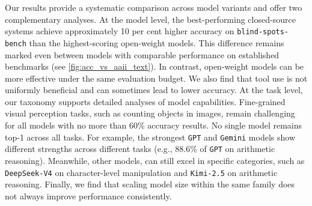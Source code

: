 \documentclass{article}
\newcommand{\bench}{\texttt{blind-spots-bench}\xspace}    %
\begin{document}


Our results provide a systematic comparison across model variants and offer two complementary analyses. At the model level, the best-performing closed-source systems achieve approximately 10 per cent higher accuracy on \bench than the highest-scoring open-weight models. This difference remains marked even between models with comparable performance on established benchmarks (see \autoref{fig:acc_vs_aaii_text}). In contrast, open-weight models can be more effective under the same evaluation budget. We also find that tool use is not uniformly beneficial and can sometimes lead to lower accuracy. At the task level, our taxonomy supports detailed analyses of model capabilities. Fine-grained visual perception tasks, such as counting objects in images, remain challenging for all models with no more than 60\% accuracy results. No single model remains top-1 across all tasks. For example, the strongest \texttt{GPT} and \texttt{Gemini} models show different strengths across different tasks (e.g., 88.6\% of \texttt{GPT} on arithmetic reasoning). Meanwhile, other models, can still excel in specific categories, such as \texttt{DeepSeek-V4} on character-level manipulation and \texttt{Kimi-2.5} on arithmetic reasoning. Finally, we find that scaling model size within the same family does not always improve performance consistently.
\end{document}
